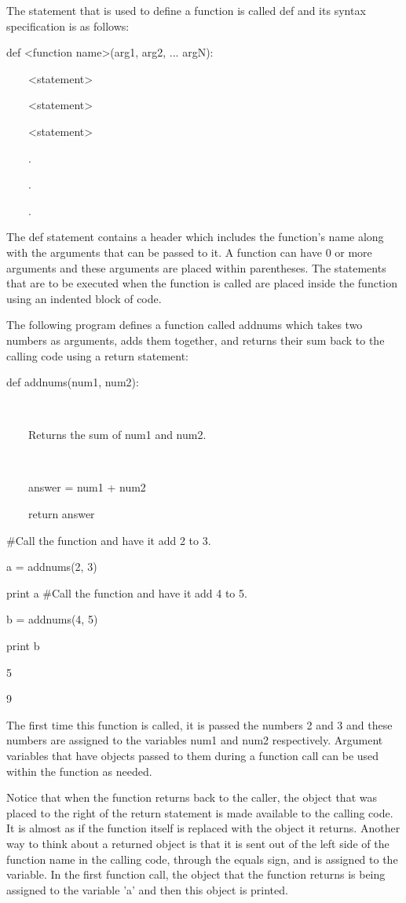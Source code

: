 \documentclass[12pt,oneside]{book}
\begin{document}
The statement that is used to define a function is called def and its syntax specification is as follows: 

def {\textless}function name{\textgreater}(arg1, arg2, ... argN):

\ \ \ \ {\textless}statement{\textgreater}

\ \ \ \ {\textless}statement{\textgreater}

\ \ \ \ {\textless}statement{\textgreater}

\ \ \ \ .

\ \ \ \ .

\ \ \ \ .


The def statement contains a header which includes the function's name along with the arguments that can be passed to it. A function can have 0 or more arguments and these arguments are placed within parentheses. The statements that are to be executed when the function is called are placed inside the function using an indented block of code. 


The following program defines a function called addnums which takes two numbers as arguments, adds them together, and returns their sum back to the calling code using a return statement: 

def addnums(num1, num2):

\ \ \ \ {\textquotedbl}{\textquotedbl}{\textquotedbl}

\ \ \ \ Returns the sum of num1 and num2.

\ \ \ \ {\textquotedbl}{\textquotedbl}{\textquotedbl}

\ \ \ \ answer = num1 + num2

\ \ \ \ return answer


\#Call the function and have it add 2 to 3.

a = addnums(2, 3)

print a
\#Call the function and have it add 4 to 5.

b = addnums(4, 5)

print b

{\textbar}

5

9

The first time this function is called, it is passed the numbers 2 and 3 and these numbers are assigned to the variables num1 and num2 respectively. Argument variables that have objects passed to them during a function call can be used within the function as needed. 

Notice that when the function returns back to the caller, the object that was placed to the right of the return statement is made available to the calling code. It is almost as if the function itself is replaced with the object it returns. Another way to think about a returned object is that it is sent out of the left side of the function name in the calling code, through the equals sign, and is assigned to the variable. In the first function call, the object that the function returns is being assigned to the variable 'a' and then this object is printed. 
\end{document}
